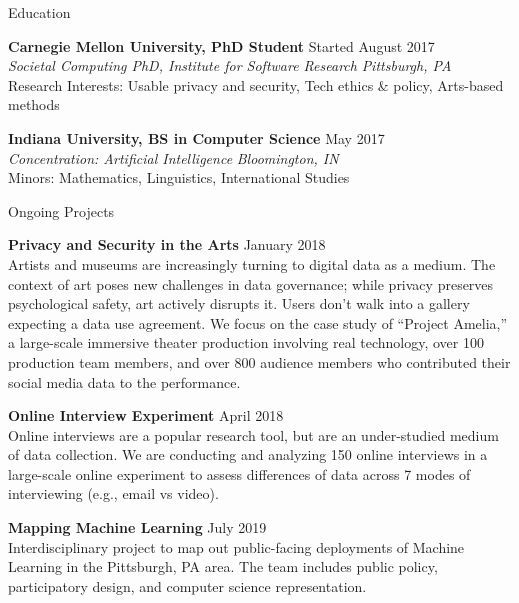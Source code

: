 \documentclass{resume} %
\begin{document}

\begin{rSection}{Education}

{\bf Carnegie Mellon University, PhD Student} \hfill Started August 2017 \\ 
\textit{Societal Computing PhD, Institute for Software Research} \hfill {\em Pittsburgh, PA}\\
Research Interests: Usable privacy and security, Tech ethics \& policy, Arts-based methods

{\bf Indiana University, BS in Computer Science} \hfill May 2017 \\ 
\textit{Concentration: Artificial Intelligence} \hfill {\em Bloomington, IN}\\
Minors: Mathematics, Linguistics, International Studies

\end{rSection}


\begin{rSection}{Ongoing Projects}

{\bf Privacy and Security in the Arts} \hfill January 2018 \\ 
Artists and museums are increasingly turning to digital data as a medium. The context of art poses new challenges in data governance; while privacy preserves psychological safety, art actively disrupts it. Users don't walk into a gallery expecting a data use agreement. We focus on the case study of ``Project Amelia,'' a large-scale immersive theater production involving real technology, over 100 production team members, and over 800 audience members who contributed their social media data to the performance.


{\bf Online Interview Experiment} \hfill April 2018 \\ 
	Online interviews are a popular research tool, but are an under-studied medium of data collection. We are conducting and analyzing 150 online interviews in a large-scale online experiment to assess differences of data across 7 modes of interviewing (e.g., email vs video).


{\bf Mapping Machine Learning} \hfill July 2019 \\ 
Interdisciplinary project to map out public-facing deployments of Machine Learning in the Pittsburgh, PA area. The team includes public policy, participatory design, and computer science representation.

\end{rSection}
\end{document}
